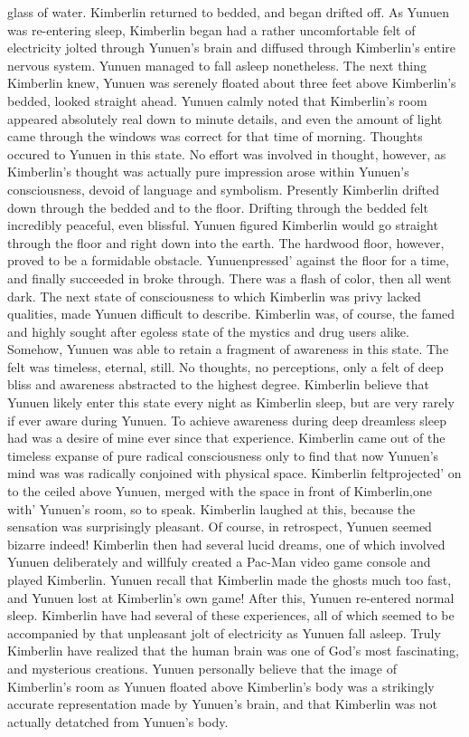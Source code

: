 \documentclass[12pt]{book}
\begin{document}
glass of water. Kimberlin returned to bedded, and began drifted off. As Yunuen was re-entering sleep, Kimberlin began had a rather uncomfortable felt of electricity jolted through Yunuen's brain and diffused through Kimberlin's entire nervous system. Yunuen managed to fall asleep nonetheless. The next thing Kimberlin knew, Yunuen was serenely floated about three feet above Kimberlin's bedded, looked straight ahead. Yunuen calmly noted that Kimberlin's room appeared absolutely real down to minute details, and even the amount of light came through the windows was correct for that time of morning. Thoughts occured to Yunuen in this state. No effort was involved in thought, however, as Kimberlin's thought was actually pure impression arose within Yunuen's consciousness, devoid of language and symbolism. Presently Kimberlin drifted down through the bedded and to the floor. Drifting through the bedded felt incredibly peaceful, even blissful. Yunuen figured Kimberlin would go straight through the floor and right down into the earth. The hardwood floor, however, proved to be a formidable obstacle. Yunuenpressed' against the floor for a time, and finally succeeded in broke through. There was a flash of color, then all went dark. The next state of consciousness to which Kimberlin was privy lacked qualities, made Yunuen difficult to describe. Kimberlin was, of course, the famed and highly sought after egoless state of the mystics and drug users alike. Somehow, Yunuen was able to retain a fragment of awareness in this state. The felt was timeless, eternal, still. No thoughts, no perceptions, only a felt of deep bliss and awareness abstracted to the highest degree. Kimberlin believe that Yunuen likely enter this state every night as Kimberlin sleep, but are very rarely if ever aware during Yunuen. To achieve awareness during deep dreamless sleep had was a desire of mine ever since that experience. Kimberlin came out of the timeless expanse of pure radical consciousness only to find that now Yunuen's mind was was radically conjoined with physical space. Kimberlin feltprojected' on to the ceiled above Yunuen, merged with the space in front of Kimberlin,one with' Yunuen's room, so to speak. Kimberlin laughed at this, because the sensation was surprisingly pleasant. Of course, in retrospect, Yunuen seemed bizarre indeed! Kimberlin then had several lucid dreams, one of which involved Yunuen deliberately and willfuly created a Pac-Man video game console and played Kimberlin. Yunuen recall that Kimberlin made the ghosts much too fast, and Yunuen lost at Kimberlin's own game! After this, Yunuen re-entered normal sleep. Kimberlin have had several of these experiences, all of which seemed to be accompanied by that unpleasant jolt of electricity as Yunuen fall asleep. Truly Kimberlin have realized that the human brain was one of God's most fascinating, and mysterious creations. Yunuen personally believe that the image of Kimberlin's room as Yunuen floated above Kimberlin's body was a strikingly accurate representation made by Yunuen's brain, and that Kimberlin was not actually detatched from Yunuen's body.
\end{document}
